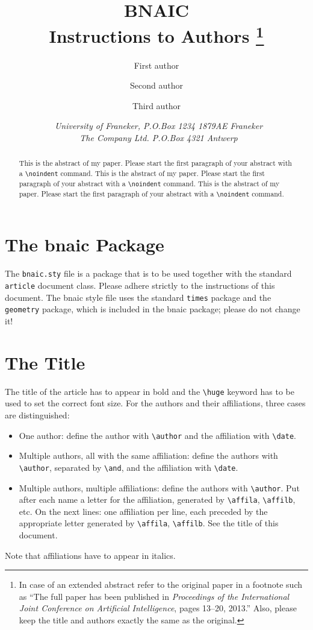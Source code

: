 \documentclass{article}
\title{\textbf{\huge BNAIC\\ Instructions to Authors}%
\footnote{In case of an extended abstract refer to the original paper in a footnote such as ``The full paper has been published in \emph{Proceedings of the International Joint Conference on Artificial Intelligence}, pages 13--20, 2013.'' Also, please keep the title and authors exactly the same as the original.}%
}
\author{First author \affila \and
    Second author \affilb \and
    Third author \affila}
\date{\affila\ \textit{University of Franeker, P.O.Box 1234 1879AE Franeker}\\
    \affilb\ \textit{The Company Ltd. P.O.Box 4321 Antwerp}}
\begin{document}
\ttl
\thispagestyle{empty}


\begin{abstract}
\noindent
This is the abstract of my paper. Please start the first paragraph of your abstract with a \verb+\noindent+ command.
This is the abstract of my paper. Please start the first paragraph of your abstract with a \verb+\noindent+ command.
This is the abstract of my paper. Please start the first paragraph of your abstract with a \verb+\noindent+ command.
\end{abstract}


\section{The bnaic Package}

The \verb+bnaic.sty+ file is a package that is to be used together with
the standard \verb+article+ document class. Please adhere strictly to the instructions of this document. The bnaic style file uses the standard \verb+times+ package and the \verb+geometry+ package, which is included in the bnaic package; please do not change it! 

\section{The Title}

The title of the article has to appear in bold and the \verb+\huge+ keyword has to be used to set the correct font size. For
the authors and their affiliations, three cases are distinguished:

\begin{itemize}
\item One author: define the author with \verb+\author+ and the affiliation
   with \verb+\date+.
\item Multiple authors, all with the same affiliation: define the authors with
   \verb+\author+, separated by \verb+\and+, and the affiliation with
   \verb+\date+.
\item Multiple authors, multiple affiliations: define the
   authors with \verb+\author+. Put after each name a letter for the
   affiliation, generated by \verb+\affila+, \verb+\affilb+, etc. On the
   next lines: one affiliation per line, each preceded by the appropriate letter
   generated by \verb+\affila+, \verb+\affilb+. See the title of this document.
\end{itemize}

Note that affiliations have to appear in italics.
\end{document}
